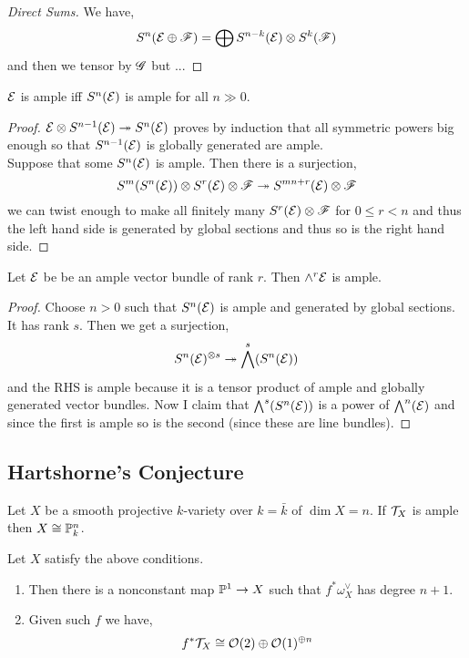 \documentclass[12pt]{article}
\begin{document}
\begin{proof}[Direct Sums]
We have,
\[ S^n(\E \oplus \F) = \bigoplus S^{n-k}(\E) \ot S^k(\F) \]
and then we tensor by $\G$ but ...
\end{proof}

\begin{prop}
$\E$ is ample iff $S^n(\E)$ is ample for all $n \gg 0$.
\end{prop}

\begin{proof}
$\E \ot S^{n-1}(\E) \onto S^n(\E)$ proves by induction that all symmetric powers big enough so that $S^{n-1}(\E)$ is globally generated are ample. 
\bigskip\\
Suppose that some $S^n(\E)$ is ample. Then there is a surjection,
\[ S^m(S^n(\E)) \ot S^r(\E) \ot \F \onto S^{mn + r}(\E) \ot \F \]
we can twist enough to make all finitely many $S^r(\E) \ot \F$ for $0 \le r < n$ and thus the left hand side is generated by global sections and thus so is the right hand side.
\end{proof}

\begin{prop}
Let $\E$ be be an ample vector bundle of rank $r$. Then $\wedge^r \E$ is ample. 
\end{prop}

\begin{proof}
Choose $n > 0$ such that $S^n(\E)$ is ample and generated by global sections. It has rank $s$. Then we get a surjection,
\[ S^n(\E)^{\ot s} \onto \bigwedge^s (S^n(\E)) \]
and the RHS is ample because it is a tensor product of ample and globally generated vector bundles. Now I claim that $\bigwedge^s (S^n(\E))$ is a power of $\bigwedge^n(\E)$ and since the first is ample so is the second (since these are line bundles).
\end{proof}

\subsection{Hartshorne's Conjecture}

\begin{thm}
Let $X$ be a smooth projective $k$-variety over $k = \bar{k}$ of $\dim{X} = n$. If $\T_X$ is ample then $X \cong \P^n_k$.
\end{thm}

\begin{prop}
Let $X$ satisfy the above conditions. 
\begin{enumerate}
\item Then there is a nonconstant map $\P^1 \to X$ such that $f^* \omega_X^\vee$ has degree $n + 1$. 

\item Given such $f$ we have,
\[ f^* \T_X \cong \struct{}(2) \oplus \struct{}(1)^{\oplus n} \]
\end{enumerate}
\end{prop}
\end{document}
